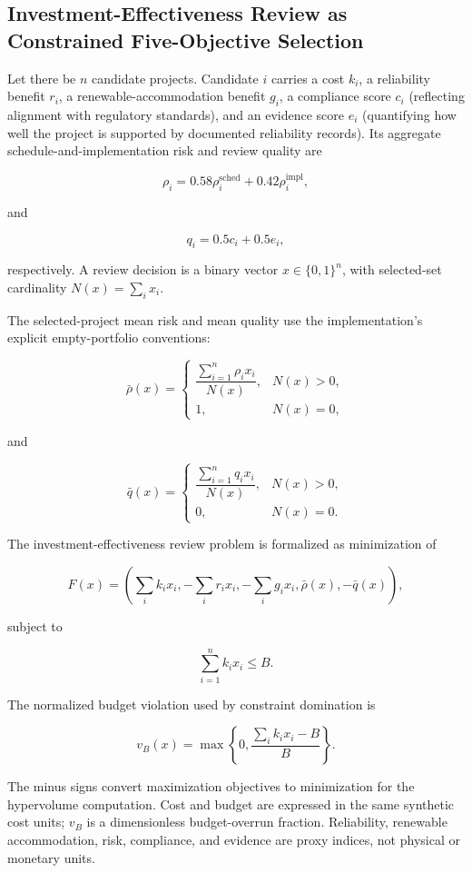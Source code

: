 \documentclass[energies,article,submit,moreauthors]{Definitions/mdpi}
\begin{document}
\subsection{Investment-Effectiveness Review as Constrained Five-Objective Selection}\label{investment-effectiveness-review-as-constrained-five-objective-selection}

Let there be \(n\) candidate projects. Candidate \(i\) carries a cost \(k_i\), a reliability benefit \(r_i\), a renewable-accommodation benefit \(g_i\), a compliance score \(c_i\) (reflecting alignment with regulatory standards), and an evidence score \(e_i\) (quantifying how well the project is supported by documented reliability records). Its aggregate schedule-and-implementation risk and review quality are

\[
\rho_i=0.58\rho_i^{\mathrm{sched}}+0.42\rho_i^{\mathrm{impl}},
\]

and

\[
q_i=0.5c_i+0.5e_i,
\]

respectively. A review decision is a binary vector \(x\in\{0,1\}^{n}\), with selected-set cardinality \(N(x)=\sum_i x_i\).

The selected-project mean risk and mean quality use the implementation's explicit empty-portfolio conventions:

\[
\bar\rho(x)=
\begin{cases}
\dfrac{\sum_{i=1}^{n}\rho_i x_i}{N(x)},&N(x)>0,\\
1,&N(x)=0,
\end{cases}
\]

and

\[
\bar q(x)=
\begin{cases}
\dfrac{\sum_{i=1}^{n}q_i x_i}{N(x)},&N(x)>0,\\
0,&N(x)=0.
\end{cases}
\]

The investment-effectiveness review problem is formalized as minimization of

\[
F(x)=\left(\sum_i k_i x_i,-\sum_i r_i x_i,-\sum_i g_i x_i,\bar\rho(x),-\bar q(x)\right),
\]

subject to

\[
\sum_{i=1}^{n}k_i x_i\leq B.
\]

The normalized budget violation used by constraint domination is

\[
v_B(x)=\max\!\left\{0,\frac{\sum_i k_i x_i-B}{B}\right\}.
\]

The minus signs convert maximization objectives to minimization for the hypervolume computation. Cost and budget are expressed in the same synthetic cost units; \(v_B\) is a dimensionless budget-overrun fraction. Reliability, renewable accommodation, risk, compliance, and evidence are proxy indices, not physical or monetary units.
\end{document}

